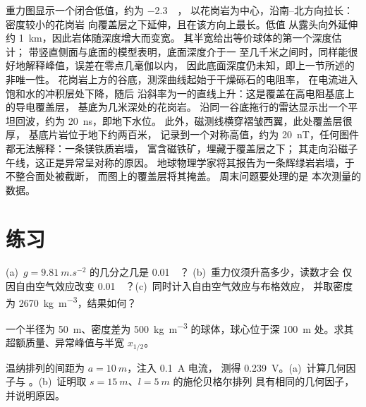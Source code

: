 \begin{example}[瓦尔登测量]\label{ex:b3:field-lab-methods-3:varden}
重力图显示一个闭合低值，约为 \qty{-2.3}{\milli\gal}，
以花岗岩为中心，沿南–北方向拉长：密度较小的花岗岩
向覆盖层之下延伸，且在该方向上最长。低值
从露头向外延伸约 \qty{1}{km}，因此岩体随深度增大而变宽。
其半宽给出等价球体的第一个深度估计；
带竖直侧面与底面的模型表明，底面深度介于一
至几千米之间时，同样能很好地解释峰值，误差在零点几毫伽以内，
因此底面深度仍未知，即上一节所述的非唯一性。
花岗岩上方的谷底，测深曲线起始于干燥砾石的电阻率，
在电流进入饱和水的冲积层处下降，随后
沿斜率为一的直线上升：这是覆盖在高电阻基底上的导电覆盖层，
基底为几米深处的花岗岩。
沿同一谷底拖行的雷达显示出一个平坦回波，约为 \qty{20}{ns}，即地下水位。
此外，磁测线横穿褶皱西翼，此处覆盖层很厚，
基底片岩位于地下约两百米，
记录到一个对称高值，约为 \qty{20}{nT}，任何图件都无法解释：一条镁铁质岩墙，
富含磁铁矿，埋藏于覆盖层之下；
其走向沿磁子午线，这正是异常呈对称的原因。
地球物理学家将其报告为一条辉绿岩岩墙，于不整合面处被截断，
而图上的覆盖层将其掩盖。
周末问题要处理的是
本次测量的数据。
\end{example}

\section{练习}

\begin{exercise}[$\star$]\label{exo:b3:field-lab-methods-3:1}
(a)~$g = \qty{9.81}{m.s^{-2}}$ 的几分之几是 \qty{0.01}{\milli\gal}？
(b)~重力仪须升高多少，读数才会
仅因自由空气效应改变 \qty{0.01}{\milli\gal}？(c)~同时计入自由空气效应与布格效应，
并取密度为
\qty{2670}{kg.m^{-3}}，结果如何？
\end{exercise}

\begin{exercise}[$\star$]\label{exo:b3:field-lab-methods-3:2}
一个半径为 \qty{50}{m}、密度差为
\qty{+500}{kg.m^{-3}} 的球体，球心位于深 \qty{100}{m} 处。求其
超额质量、异常峰值与半宽 $x_{1/2}$。
\end{exercise}

\begin{exercise}[$\star$]\label{exo:b3:field-lab-methods-3:3}
温纳排列的间距为 $a = \qty{10}{m}$，注入 \qty{0.1}{A} 电流，
测得 \qty{0.239}{V}。(a)~计算几何因子与
。(b)~证明取 $s =
\qty{15}{m}$、$l = \qty{5}{m}$ 的施伦贝格尔排列
具有相同的几何因子，并说明原因。
\end{exercise}

